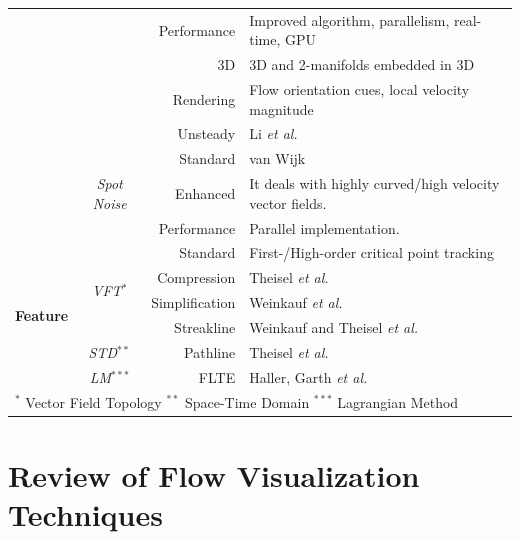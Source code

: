 \begin{table}
\begin{tabular}{c c r p{8.5cm}}
					& 							&\cc Performance	&\cc Improved algorithm, parallelism, real-time, GPU\cite{Li:2006:GIA:2384796.2384800}\\
					& 							&\cc 3D			&\cc 3D and 2-manifolds embedded in 3D\cite{10.1109/TVCG.2010.121}\\
					& 							&\cc Rendering		&\cc Flow orientation cues, local velocity magnitude\\
					& 							&\cc Unsteady 		&\cc Li \emph{et al.}\cite{Li:2006:GIA:2384796.2384800}\\
					&\multirow{3}{*}{\em Spot Noise}	& Standard			& van Wijk\cite{vanWijk:1991vd} \\
					& 							& Enhanced 		& It deals with highly curved/high velocity vector fields.\cite{deLeeuw:1995tp} \\
					& 							& Performance		& Parallel implementation.\cite{Leeuw:1997vr} \\
\hline
\multirow{6}{*}{\bf Feature}	&\multirow{4}{*}{\em VFT$^{*}$}	&\cc Standard		&\cc First-/High-order critical point tracking\cite{Helman:1989:RDV:72885.72887,de1999visualization,Scheuermann:1998:VNV:614270.614397} \\
						& 							&\cc Compression 	&\cc Theisel \emph{et al.}\cite{CGF:CGF680}\\
						&							&\cc Simplification	&\cc Weinkauf \emph{et al.}\cite{weinkauf05a}\\
						& 							&\cc Streakline 		&\cc Weinkauf and Theisel \emph{et al.}\cite{Weinkauf:2010:SLT:1907651.1908009}\\
						&\multirow{1}{*}{\em STD$^{**}$}	& Pathline			&Theisel \emph{et al.}\cite{Theisel:2005:TMT:1070610.1070741} \\
						&\multirow{1}{*}{\em LM$^{***}$}	&\cc FLTE			&\cc Haller\cite{Haller:2001:DMS:370169.370176},  Garth \emph{et al.}\cite{Garth:2007:ECV:1313046.1313106}\\
\hline
\multicolumn{4}{l}{$^{*}$ Vector Field Topology $^{**}$ Space-Time Domain $^{***}$ Lagrangian Method}\\
\bottomrule
\end{tabular}
\end{table}

\section{Review of Flow Visualization Techniques}
\label{sec:flowvis}


